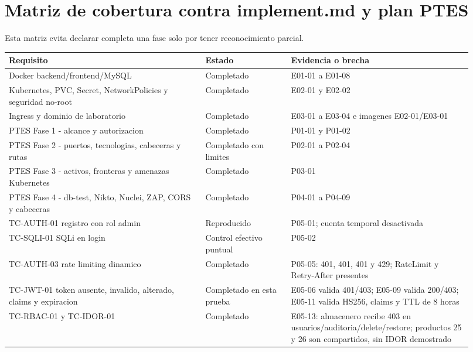 \section{Matriz de cobertura contra implement.md y plan PTES}\label{matriz-de-cobertura-contra-implementmd-y-plan-ptes}

Esta matriz evita declarar completa una fase solo por tener reconocimiento parcial.

{\def\LTcaptype{none} %
\small
\setlength{\tabcolsep}{3pt}
\label{tab:matriz-cobertura}
\begin{longtable}[]{@{}>{\raggedright\arraybackslash}p{0.39\linewidth}>{\raggedright\arraybackslash}p{0.17\linewidth}>{\raggedright\arraybackslash}p{0.36\linewidth}@{}}
\toprule\noalign{}
Requisito & Estado & Evidencia o brecha \\
\midrule\noalign{}
\endhead
\bottomrule\noalign{}
\endlastfoot
Docker backend/frontend/MySQL & Completado & E01-01 a E01-08 \\
Kubernetes, PVC, Secret, NetworkPolicies y seguridad no-root & Completado & E02-01 y E02-02 \\
Ingress y dominio de laboratorio & Completado & E03-01 a E03-04 e imagenes E02-01/E03-01 \\
PTES Fase 1 - alcance y autorizacion & Completado & P01-01 y P01-02 \\
PTES Fase 2 - puertos, tecnologias, cabeceras y rutas & Completado con limites & P02-01 a P02-04 \\
PTES Fase 3 - activos, fronteras y amenazas Kubernetes & Completado & P03-01 \\
PTES Fase 4 - db-test, Nikto, Nuclei, ZAP, CORS y cabeceras & Completado & P04-01 a P04-09 \\
TC-AUTH-01 registro con rol admin & Reproducido & P05-01; cuenta temporal desactivada \\
TC-SQLI-01 SQLi en login & Control efectivo puntual & P05-02 \\
TC-AUTH-03 rate limiting dinamico & Completado & P05-05: 401, 401, 401 y 429; RateLimit y Retry-After presentes \\
TC-JWT-01 token ausente, invalido, alterado, claims y expiracion & Completado en esta prueba & E05-06 valida 401/403; E05-09 valida 200/403; E05-11 valida HS256, claims y TTL de 8 horas \\
TC-RBAC-01 y TC-IDOR-01 & Completado & E05-13: almacenero recibe 403 en usuarios/auditoria/delete/restore; productos 25 y 26 son compartidos, sin IDOR demostrado \\

\end{longtable}}
